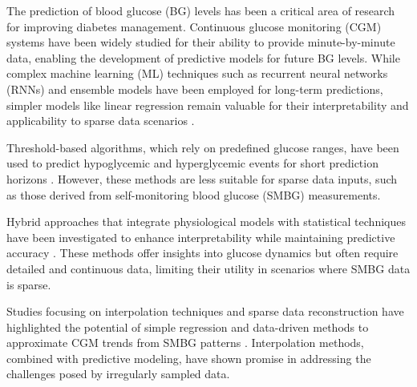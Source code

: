 \begin{comment}
As can be understood from above, there does unfortunately not yet exist a universal model or approach to forecast blood glucose levels. It appears to still be at the trial-and-error stage in order to find the right method or combination that will yield the best prediction results. More importantly, there is also an absence of a universal way to estimate carbohydrate intake and to account for the effect of certain parameters such as the patient's physical activity, stress and illnesses or infections \cite{woldaregay_data-driven_2019}. Strengthening feature robustness is an important step towards improving the model outcomes.

\end{comment}


The prediction of blood glucose (BG) levels has been a critical area of research for improving diabetes management. Continuous glucose monitoring (CGM) systems have been widely studied for their ability to provide minute-by-minute data, enabling the development of predictive models for future BG levels. While complex machine learning (ML) techniques such as recurrent neural networks (RNNs) and ensemble models have been employed for long-term predictions, simpler models like linear regression remain valuable for their interpretability and applicability to sparse data scenarios \cite{woldaregay2019data, li2019deep}.

Threshold-based algorithms, which rely on predefined glucose ranges, have been used to predict hypoglycemic and hyperglycemic events for short prediction horizons \cite{buckingham2017evaluation}. However, these methods are less suitable for sparse data inputs, such as those derived from self-monitoring blood glucose (SMBG) measurements.

Hybrid approaches that integrate physiological models with statistical techniques have been investigated to enhance interpretability while maintaining predictive accuracy \cite{lehmann1998compartmental, mougiakakou2005real}. These methods offer insights into glucose dynamics but often require detailed and continuous data, limiting their utility in scenarios where SMBG data is sparse.

Studies focusing on interpolation techniques and sparse data reconstruction have highlighted the potential of simple regression and data-driven methods to approximate CGM trends from SMBG patterns \cite{vig2005smcg}. Interpolation methods, combined with predictive modeling, have shown promise in addressing the challenges posed by irregularly sampled data.

